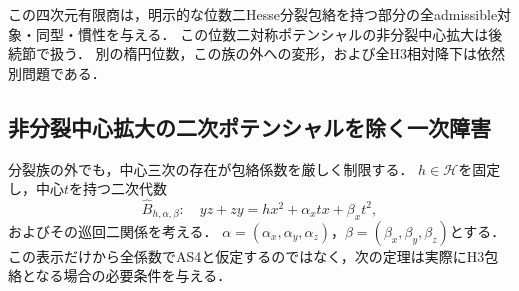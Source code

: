 この四次元有限商は，明示的な位数二Hesse分裂包絡を持つ部分の全admissible対象・同型・慣性を与える．
この位数二対称ポテンシャルの非分裂中心拡大は後続節で扱う．
別の楕円位数，この族の外への変形，および全H3相対降下は依然別問題である．

\subsection{非分裂中心拡大の二次ポテンシャルを除く一次障害}
\label{sec:clifford-nonsplit-lift-obstruction}
分裂族の外でも，中心三次の存在が包絡係数を厳しく制限する．
$h\in\mathcal H$を固定し，中心$t$を持つ二次代数
\[
 \widehat B_{h,\alpha,\beta}:
 \quad yz+zy=h x^2+\alpha_x tx+\beta_x t^2,
\]
およびその巡回二関係を考える．
$\alpha=(\alpha_x,\alpha_y,\alpha_z)$，$\beta=(\beta_x,\beta_y,\beta_z)$とする．
この表示だけから全係数でAS4と仮定するのではなく，次の定理は実際にH3包絡となる場合の必要条件を与える．

